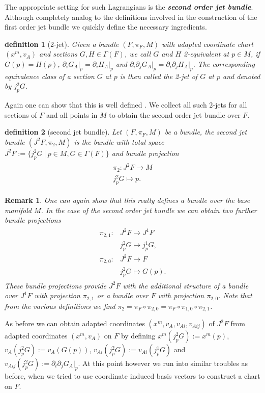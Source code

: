 \documentclass[a4paper,12pt, DIV=14, BCOR=5mm, twoside, headsepline]{scrbook}
\newtheorem{definition}{definition}[section]
\newtheorem*{remark}{Remark}
\begin{document}
The appropriate setting for such Lagrangians is the \textbf{\textit{second order jet bundle}}. Although completely analog to the definitions involved in the construction of the first order jet bundle we quickly define the necessary ingredients. 
\begin{definition}[2-jet]
Given a bundle $(F, \pi_F, M)$ with adapted coordinate chart $(x^m, v_A)$ and sections $G,H \in \Gamma(F)$, we call $G$ and $H$ 2-equivalent at $p \in M$, if $G(p) = H(p)$, $\partial_i G_A \vert_p = \partial_i H_A \vert_p$ and $\partial_i \partial_j G_A \vert_ p = \partial_i \partial_j H_A \vert_ p $. The corresponding equivalence class of a section $G$ at $p$ is then called the 2-jet of $G$ at $p$ and denoted by $j^2_pG$.
\end{definition}
Again one can show that this is well defined \cite{saunders_1989}. We collect all such 2-jets for all sections of $F$ and all points in $M$ to obtain the second order jet bundle over $F$.
\begin{definition}[second jet bundle]
Let $(F, \pi_F, M)$ be a bundle, the second jet bundle $(J^2F,\pi_2,M)$ is the bundle with total space $J^2F := \{j^2_pG \  \vert \  p \in M, G \in \Gamma(F)\}$ and bundle projection 
\begin{align*}
    \begin{aligned}
\pi_2 : J^2F \longrightarrow M \\
j^2_pG \longmapsto p.
    \end{aligned}
\end{align*}
\end{definition}
\begin{remark}
One can again show that this really defines a bundle over the base manifold $M$. In the case of the second order jet bundle we can obtain two further bundle projections 
\begin{align*}
    \begin{aligned}
    \pi_{2,1} : &J^2F \longrightarrow J^1F \\
    &j^2_pG \longmapsto j^1_pG ,\\
    \pi_{2,0} : &J^2F \longrightarrow F \\
    &j^2_pG \longmapsto G(p).
    \end{aligned}
\end{align*}
These bundle projections provide $J^2F$ with the additional structure of a bundle over $J^1F$ with projection $\pi_{2,1}$ or a bundle over $F$ with projection $\pi_{2,0}$. Note that from the various definitions we find $\pi_{2} = \pi_F \circ \pi_{2,0} = \pi_F \circ \pi_{1,0} \circ \pi_{2,1}$.
\end{remark}
As before we can obtain adapted coordinates $(x^m, v_A, v_{Ai},v_{Aij})$ of $J^2F$ from adapted coordinates $(x^m,v_A)$ on $F$ by defining $x^m(j^2_pG) := x^m(p)$, $v_A(j^2_pG):= v_A(G(p))$, $v_{Ai}(j^2_pG) := v_{Ai}(j^1_pG)$ and $v_{Aij}(j^2_pG) := \partial_i \partial_j G_A \vert _p$. 
At this point however we run into similar troubles as before, when we tried to use coordinate induced basis vectors to construct a chart on $F$. 
\end{document}
